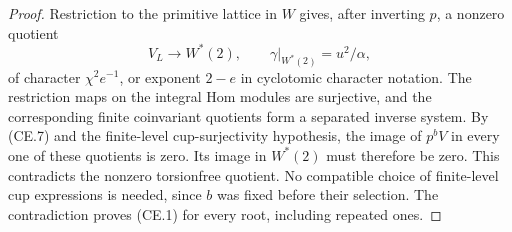 \begin{proof}
Restriction to the primitive lattice in $W$ gives, after inverting
$p$, a nonzero quotient
\[
 V_L\longrightarrow W^*(2),\qquad
 \gamma|_{W^*(2)}=u^2/\alpha,
\]
of character $\chi^2e^{-1}$, or exponent $2-e$ in cyclotomic
character notation. The restriction maps on the integral Hom
modules are surjective, and the corresponding finite coinvariant
quotients form a separated inverse system. By (CE.7) and the
finite-level cup-surjectivity hypothesis, the image of $p^bV$ in
every one of these quotients is zero. Its image in $W^*(2)$ must
therefore be zero. This contradicts the nonzero torsionfree
quotient. No compatible choice of finite-level cup expressions is
needed, since $b$ was fixed before their selection. The contradiction
proves (CE.1) for every root, including repeated ones.
\end{proof}
